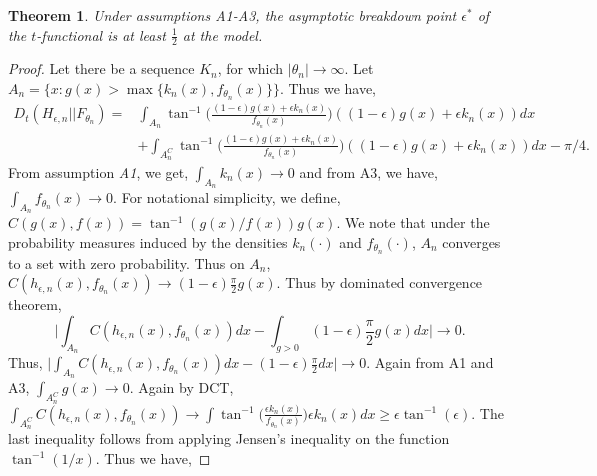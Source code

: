 \documentclass{article}
\newtheorem{thm}{Theorem}
\begin{document}
\begin{thm}
Under assumptions \textit{A1-A3}, the asymptotic breakdown point $\epsilon^*$ of the $t$-functional is at least $\frac{1}{2}$ at the model.
\end{thm}
\begin{proof}
Let there be a sequence $K_n$, for which $|\theta_n| \to \infty$. Let $A_n=\big\{x: g(x)> \max\{k_n(x),f_{\theta_n}(x)\}\big\}$. Thus we have,
\begingroup
\allowdisplaybreaks
\begin{align*}
 D_t(H_{\epsilon,n}||F_{\theta_n}) =&\int_{A_n}\tan^{-1}\bigg(\frac{(1-\epsilon)g(x)+\epsilon k_n(x)}{f_{\theta_n}(x)}\bigg)((1-\epsilon)g(x)+\epsilon k_n(x))dx \\
& + \int_{A_n^C}\tan^{-1}\bigg(\frac{(1-\epsilon)g(x)+\epsilon k_n(x)}{f_{\theta_n}(x)}\bigg)((1-\epsilon)g(x)+\epsilon k_n(x))dx -\pi/4.
\end{align*}
\endgroup
From assumption \textit{A1}, we get, $\int_{A_n}k_n(x)\to 0$ and from A3, we have, $\int_{A_n}f_{\theta_n}(x) \to 0$. For notational simplicity, we define, $C(g(x),f(x))=\tan^{-1}(g(x)/f(x))g(x)$. We note that under the probability measures induced by the densities $k_n(\cdot)$ and $f_{\theta_n}(\cdot)$, $A_n$ converges to a set with zero probability. Thus on $A_n$, $C(h_{\epsilon,n}(x),f_{\theta_n}(x)) \to (1-\epsilon)\frac{\pi}{2}g(x).$ Thus by dominated convergence theorem, 
\begin{equation}
    \bigg|\int_{A_n}C(h_{\epsilon,n}(x),f_{\theta_n}(x))dx - \int_{g>0} (1-\epsilon)\frac{\pi}{2}g(x)dx\bigg| \to 0.
\end{equation}
Thus, $ \big|\int_{A_n}C(h_{\epsilon,n}(x),f_{\theta_n}(x))dx - (1-\epsilon)\frac{\pi}{2}dx\big| \to 0.$
Again from A1 and A3, $\int_{A_n^C}g(x) \to 0$. Again by DCT, $\int_{A_n^C}C(h_{\epsilon,n}(x),f_{\theta_n}(x)) \to \int \tan^{-1}\bigg(\frac{\epsilon k_n(x)}{f_{\theta_n}(x)}\bigg) \epsilon k_n(x)dx \geq \epsilon \tan^{-1} (\epsilon).$
The last inequality follows from applying Jensen's inequality on the function $\tan^{-1}(1/x)$. Thus we have,

\end{proof}
\end{document}

